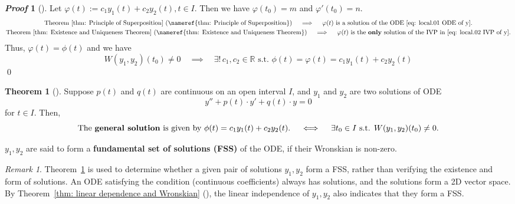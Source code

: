 \documentclass[10pt,UTF8]{article}
\newenvironment{theoremBox}
{
  \begin{tcolorbox}[colback=yellow!5!white,colframe=yellow!75!black,parbox=false,before
  upper=\par,before lower=\par]}
  {
\end{tcolorbox}}
\theoremstyle{definition}
\newtheorem{definition inner}{Definition}[section]
\theoremstyle{definition}
\newtheorem{theorem inner}{Theorem}[section]
\newenvironment{theorem}[1][]
{
  \begin{theoremBox}
  \begin{theorem inner}[#1]\hfill\par}
    {
    \end{theorem inner}
\end{theoremBox}}
\theoremstyle{definition}
\newtheorem*{proof inner}{\textit{Proof}}
\renewenvironment{proof}[1][]
{
\begin{proof inner}[#1]\hfill\par}
  {\qed\vphantom{.}
\end{proof inner}}
\theoremstyle{plain}
\newtheorem{tip inner}{Tip}[section]
\theoremstyle{remark}
\newtheorem*{remark}{\textit{Remark}}
\begin{document}
\begin{proof}
  Let \(\varphi(t) := c_1 y_1(t) + c_2 y_2(t), t\in I\).
  Then we have \(\varphi(t_0) = m\) and \(\varphi'(t_0) = n\).
  \begin{gather*}
    \text{Theorem~\ref{thm: Principle of Superposition}
    (\nameref{thm: Principle of Superposition})}
    \quad\implies\quad
    \varphi(t) \text{ is a solution of the ODE \cref{eq: local.01 ODE of y}.} \\
    \text{Theorem~\ref{thm: Existence and Uniqueness Theorem}
    (\nameref{thm: Existence and Uniqueness Theorem})}
    \quad\implies\quad
    \varphi(t) \text{ is the \textbf{only} solution of the IVP in
    \cref{eq: local.02 IVP of y}.}
  \end{gather*}
  Thus, \(\varphi(t) = \phi(t)\) and we have
  \begin{equation*}
    W(y_1,y_2)(t_0) \neq 0
    \quad\implies\quad
    \exists !\, c_1, c_2 \in \mathbb{R} \text{ s.t. }
    \phi(t) = \varphi(t) = c_1 y_1(t) + c_2 y_2(t)
  \end{equation*}
\end{proof}

\begin{theorem}
  {}\label{thm: Wronskian and general solution of a homogeneous ODE}
  Suppose \(p(t)\) and \(q(t)\) are continuous on an open interval \(I\),
  and \(y_1\) and \(y_2\) are two solutions of ODE
  \begin{equation*}
    y'' + p(t)\cdot y' + q(t)\cdot y = 0
  \end{equation*}
  for \(t \in I\).
  Then,
  \begin{equation*}
    \text{The \textbf{general solution} is given by }
    \phi(t) = c_1 y_1(t) + c_2 y_2(t).
    \quad\iff\quad
    \exists t_0 \in I \text{ s.t. } W(y_1,y_2)(t_0) \neq 0.
  \end{equation*}

  \(y_1, y_2\) are said to form a
  \textbf{fundamental set of solutions (FSS)} of the ODE,
  if their Wronskian is non-zero.
\end{theorem}

\begin{remark}
  Theorem~\ref{thm: Wronskian and general solution of a homogeneous ODE}
  is used to determine whether a given pair of solutions
  \(y_1, y_2\) form a FSS,
  rather than verifying the existence and form of solutions.
  An ODE satisfying the condition (continuous coefficients)
  always has solutions, and the solutions form a 2D vector space.
  By Theorem~\ref{thm: linear dependence and Wronskian}
  (),
  the linear independence of \(y_1, y_2\) also indicates
  that they form a FSS\@.
\end{remark}
\end{document}
